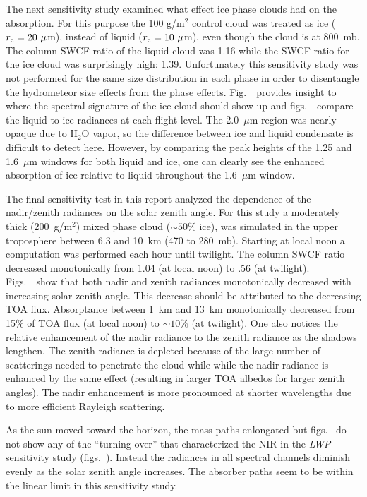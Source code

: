 The next sensitivity study examined what effect ice phase clouds had
on the absorption. 
For this purpose the 100 g/m$^2$ control cloud was treated as
ice ($r_{\rm e} = 20\ \mu$m), 
instead of liquid ($r_{\rm e} = 10\ \mu$m), 
even though the cloud is at 800~mb. 
The column SWCF ratio of the liquid cloud was 1.16
while the SWCF ratio for the ice cloud was surprisingly high: 1.39.
Unfortunately this sensitivity study was not performed for the
same size distribution in each phase in order to disentangle the
hydrometeor size effects from the phase effects.
Fig.~\ provides
insight to where the spectral
signature of the ice cloud should show up and 
figs.~\ compare the liquid to ice radiances at
each flight level.
The 2.0~$\mu$m region was nearly opaque due to H$_2$O vapor,
so the difference between ice and liquid condensate is difficult
to detect here.
However, by comparing the peak heights of the 1.25 and 1.6~$\mu$m
windows for both liquid and ice, one can clearly see the enhanced
absorption of ice relative to liquid throughout the 1.6~$\mu$m window. 
\medskip
{}\nobreak

The final sensitivity test in this report analyzed the dependence of
the nadir/zenith radiances on the solar zenith angle.
For this study a moderately thick (200~g/m$^2$) mixed phase cloud
($\sim 50$\% ice), was simulated in the upper troposphere
between 6.3 and 10~km (470 to 280~mb).
Starting at local noon a computation was performed each hour until
twilight. 
The column SWCF ratio decreased monotonically from 1.04 (at
local noon) to .56 (at twilight).
Figs.~\ show that
both nadir and zenith radiances monotonically decreased with
increasing solar zenith angle.
This decrease should be attributed to the decreasing TOA flux.
Absorptance between 1~km and 13~km monotonically decreased from
15\% of TOA flux (at local noon) to $\sim 10\%$ (at twilight).
One also notices the relative enhancement of the nadir radiance to the 
zenith radiance as the shadows lengthen.
The zenith radiance is depleted because of the large number of
scatterings needed to penetrate the cloud while while the nadir
radiance is enhanced by the same effect (resulting in larger TOA
albedos for larger zenith angles).
The nadir enhancement is more pronounced at shorter wavelengths due to
more efficient Rayleigh scattering.

As the sun moved toward the horizon, the mass paths enlongated
but figs.~\/ do not show any 
of the ``turning over'' that characterized the NIR in the {\it LWP\/}
sensitivity study (figs.~\/).
Instead the radiances in all spectral channels diminish evenly
as the solar zenith angle increases.
The absorber paths seem to be within the linear limit in this
sensitivity study.

